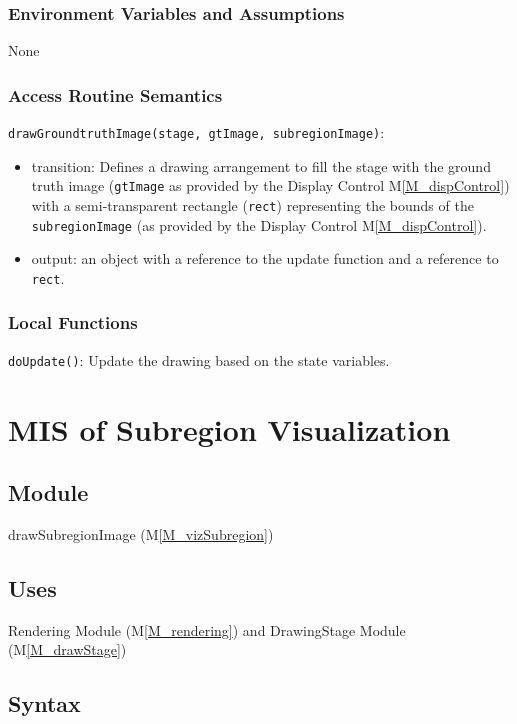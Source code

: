 \documentclass[12pt, titlepage]{article}
\newcommand{\mref}[1]{M\ref{#1}}
\newcommand{\mrefp}[1]{(\mref{#1})}
\newcommand{\mreff}[1]{Module \mrefp{#1}}
\newcommand{\code}[1]{\texttt{#1}}
\begin{document}
\subsubsection{Environment Variables and Assumptions}
None

\subsubsection{Access Routine Semantics}

\noindent \code{drawGroundtruthImage(stage, gtImage, subregionImage)}:
\begin{itemize}
\item transition: Defines a drawing arrangement to fill the stage with the ground truth image
  (\code{gtImage} as provided by the Display Control \mref{M_dispControl})
  with a semi-transparent rectangle (\code{rect}) representing the bounds of the
  \code{subregionImage} (as provided by the Display Control \mref{M_dispControl}).
\item output: an object with a reference to the update function and a reference to \code{rect}.
\end{itemize}

\subsubsection{Local Functions}
\code{doUpdate()}: Update the drawing based on the state variables.

\newpage



\section{MIS of Subregion Visualization} \label{MS_vizSubregion}

\subsection{Module}
drawSubregionImage \mrefp{M_vizSubregion}

\subsection{Uses}
Rendering \mreff{M_rendering} and DrawingStage \mreff{M_drawStage}

\subsection{Syntax}
\end{document}
